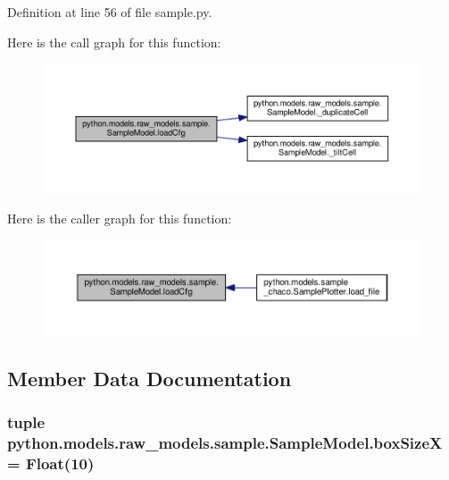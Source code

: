 Definition at line 56 of file sample.\-py.



Here is the call graph for this function\-:
\nopagebreak
\begin{figure}[H]
\begin{center}
\leavevmode
\includegraphics[width=350pt]{classpython_1_1models_1_1raw__models_1_1sample_1_1_sample_model_a1f0c650a5823ddfd6d9fe7aff8b706e1_cgraph}
\end{center}
\end{figure}




Here is the caller graph for this function\-:
\nopagebreak
\begin{figure}[H]
\begin{center}
\leavevmode
\includegraphics[width=350pt]{classpython_1_1models_1_1raw__models_1_1sample_1_1_sample_model_a1f0c650a5823ddfd6d9fe7aff8b706e1_icgraph}
\end{center}
\end{figure}




\subsection{Member Data Documentation}
\hypertarget{classpython_1_1models_1_1raw__models_1_1sample_1_1_sample_model_af80dd848050bf997864877f91dfade52}{
\subsubsection[{box\-Size\-X}]{\setlength{\rightskip}{0pt plus 5cm}tuple python.\-models.\-raw\-\_\-models.\-sample.\-Sample\-Model.\-box\-Size\-X = Float(10)\hspace{0.3cm}{\ttfamily [static]}}}\label{classpython_1_1models_1_1raw__models_1_1sample_1_1_sample_model_af80dd848050bf997864877f91dfade52}



